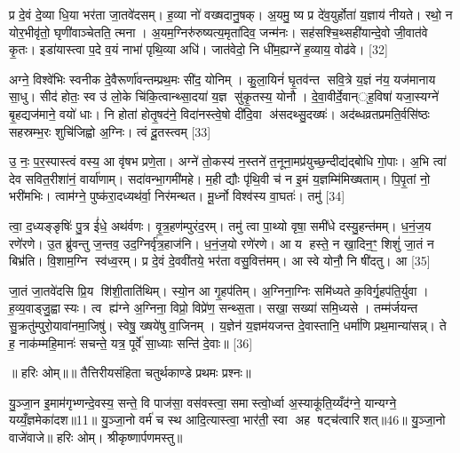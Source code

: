 प्र दे॒वं दे॒व्या धि॒या भर॑ता जा॒तवे॑दसम्। ह॒व्या नो॑ वख्षदानु॒षक्। अ॒यमु॒ ष्य प्र दे॑व॒युर्\mbox{}होता॑ य॒ज्ञाय॑ नीयते। रथो॒ न योर॒भीवृ॑तो॒ घृणी॑वाञ्चेतति॒ त्मना। अ॒यम॒ग्निरु॑रुष्यत्य॒मृता॑दिव॒ जन्म॑नः। सह॑सश्चि॒थ्सही॑यान्दे॒वो जी॒वात॑वे कृ॒तः। इडा॑यास्त्वा प॒दे व॒यं नाभा॑ पृथि॒व्या अधि॑। जात॑वेदो॒ नि धी॑म॒ह्यग्ने॑ ह॒व्याय॒ वोढ॑वे। [32]

अग्ने॒ विश्वे॑भिः स्वनीक दे॒वैरूर्णा॑वन्तम्प्रथ॒मः सी॑द॒ योनिम्। कु॒ला॒यिनं॑ घृ॒तव॑न्त सवि॒त्रे य॒ज्ञं न॑य॒ यज॑मानाय सा॒धु। सीद॑ होतः॒ स्व उ॑ लो॒के चि॑कि॒त्वान्थ्सा॒दया॑ य॒ज्ञ सु॑कृ॒तस्य॒ योनौ। दे॒वा॒वीर्दे॒वान््ह॒विषा॑ यजा॒स्यग्ने॑ बृ॒हद्यज॑माने॒ वयो॑ धाः। नि होता॑ होतृ॒षद॑ने॒ विदा॑नस्त्वे॒षो दी॑दि॒वा अ॑सदथ्सु॒दख्षः॑। अद॑ब्धव्रतप्रमति॒र्वसि॑ष्ठः सहस्रम्भ॒रः शुचि॑जिह्वो अ॒ग्निः। त्वं दू॒तस्त्वम् [33]

उ॒ नः॒ प॒र॒स्पास्त्वं वस्य॒ आ वृ॑षभ प्रणे॒ता। अग्ने॑ तो॒कस्य॑ न॒स्तने॑ त॒नूना॒मप्र॑युच्छ॒न्दीद्य॑द्बोधि गो॒पाः। अ॒भि त्वा॑ देव सवित॒रीशा॑नं॒ वार्या॑णाम्। सदा॑वन्भा॒गमी॑महे। म॒ही द्यौः पृ॑थि॒वी च॑ न इ॒मं य॒ज्ञम्मि॑मिख्षताम्। पि॒पृ॒तां नो॒ भरी॑मभिः। त्वाम॑ग्ने॒ पुष्क॑रा॒दध्यथ॑र्वा॒ निर॑मन्थत। मू॒र्ध्नो विश्व॑स्य वा॒घतः॑। तमु॑ [34]

त्वा॒ द॒ध्यङ्ङृषिः॑ पु॒त्र ई॑धे॒ अथ॑र्वणः। वृ॒त्र॒हण॑म्पुरंद॒रम्। तमु॑ त्वा पा॒थ्यो वृषा॒ समी॑धे दस्यु॒हन्त॑मम्। ध॒नं॒ज॒य रणे॑रणे। उ॒त ब्रु॑वन्तु ज॒न्तव॒ उद॒ग्निर्वृ॑त्र॒हाज॑नि। ध॒नं॒ज॒यो रणे॑रणे। आ य हस्ते॒ न खा॒दिन॒ꣳ॒ शिशुं॑ जा॒तं न बिभ्र॑ति। वि॒शाम॒ग्नि स्व॑ध्व॒रम्। प्र दे॒वं दे॒ववी॑तये॒ भर॑ता वसु॒वित्त॑मम्। आ स्वे योनौ॒ नि षी॑दतु। आ [35]

जा॒तं जा॒तवे॑दसि प्रि॒य शि॑शी॒ताति॑थिम्। स्यो॒न आ गृ॒हप॑तिम्। अ॒ग्निना॒ग्निः समि॑ध्यते क॒विर्गृ॒हप॑ति॒र्युवा। ह॒व्य॒वाड्जु॒ह्वास्यः। त्व ह्य॑ग्ने अ॒ग्निना॒ विप्रो॒ विप्रे॑ण॒ सन्थ्स॒ता। सखा॒ सख्या॑ समि॒ध्यसे। तम्म॑र्जयन्त सु॒क्रतु॑म्पुरो॒यावा॑नमा॒जिषु॑। स्वेषु॒ ख्षये॑षु वा॒जिनम्। य॒ज्ञेन॑ य॒ज्ञम॑यजन्त दे॒वास्तानि॒ धर्मा॑णि प्रथ॒मान्या॑सन्न्। ते ह॒ नाक॑म्महि॒मानः॑ सचन्ते॒ यत्र॒ पूर्वे॑ सा॒ध्याः सन्ति॑ दे॒वाः॥ [36]

{\scriptsize {॥ हरिः ओम्॥॥ तैत्तिरीयसंहिता चतुर्थकाण्डे प्रथमः प्रश्नः॥}}

{\scriptsize {यु॒ञ्जा॒न इ॒माम॑गृभ्णन्दे॒वस्य॒ सन्ते॒ वि पाज॑सा॒ वस॑वस्त्वा॒ समास्त्वो॒र्ध्वा अ॒स्याकू॑ति॒य्यँद॑ग्ने॒ यान्यग्ने॒ यय्यँ॒ज्ञमेका॑दश॥11॥ यु॒ञ्जा॒नो वर्म॑ च स्थ आदि॒त्यास्त्वा॒ भार॑ती॒ स्वा अह षट्च॑त्वारिशत्॥46॥ यु॒ञ्जा॒नो वाजे॑वाजे॥ हरिः ओम्। श्रीकृष्णार्पणमस्तु॥}}


